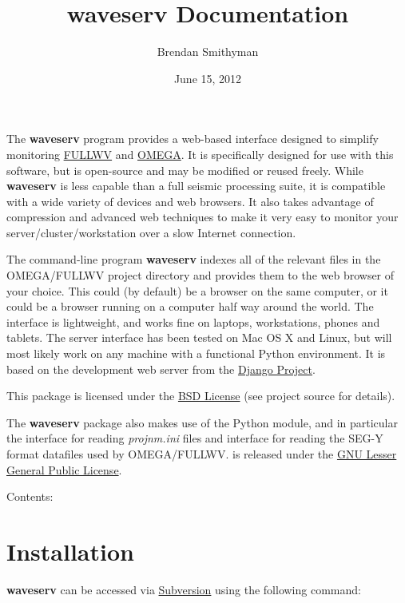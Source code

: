 \documentclass[letterpaper,10pt,english]{sphinxmanual}
\title{waveserv Documentation}
\date{June 15, 2012}
\author{Brendan Smithyman}
\begin{document}
\maketitle
\tableofcontents
{}\label{index::doc}


The \textbf{waveserv} program provides a web-based interface designed to simplify monitoring \href{http://orion.es.uwo.ca/index.php/FULLWV}{FULLWV} and \href{http://orion.es.uwo.ca/index.php/OMEGA}{OMEGA}.  It is specifically designed for use with this software, but is open-source and may be modified or reused freely.  While \textbf{waveserv} is less capable than a full seismic processing suite, it is compatible with a wide variety of devices and web browsers.  It also takes advantage of compression and advanced web techniques to make it very easy to monitor your server/cluster/workstation over a slow Internet connection.

The command-line program \textbf{waveserv} indexes all of the relevant files in the OMEGA/FULLWV project directory and provides them to the web browser of your choice.  This could (by default) be a browser on the same computer, or it could be a browser running on a computer half way around the world.  The interface is lightweight, and works fine on laptops, workstations, phones and tablets.  The server interface has been tested on Mac OS X and Linux, but will most likely work on any machine with a functional Python environment.  It is based on the development web server from the \href{http://www.djangoproject.com/}{Django Project}.

This package is licensed under the \href{http://www.opensource.org/licenses/BSD-3-Clause}{BSD License} (see project source for details).

The \textbf{waveserv} package also makes use of the  Python module, and in particular the  interface for reading \emph{projnm.ini} files and  interface for reading the SEG-Y format datafiles used by OMEGA/FULLWV.   is released under the \href{http://www.opensource.org/licenses/lgpl-3.0.html}{GNU Lesser General Public License}.

Contents:


\chapter{Installation}
\label{installation:introduction}\label{installation:installation}\label{installation:intro}\label{installation::doc}\label{installation:id1}
\textbf{waveserv} can be accessed via \href{http://subversion.apache.org/}{Subversion} using the following command:
\end{document}
